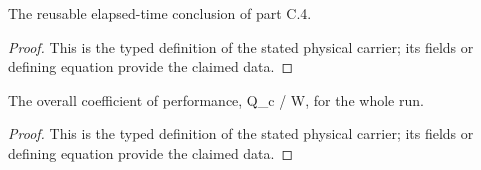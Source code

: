 \begin{definition}
  \label{def:physics:IPhO_2026_3_C_5:aux020}
  The reusable elapsed-time conclusion of part C.4.
\end{definition}
\begin{proof}
  This is the typed definition of the stated physical carrier; its fields or defining equation provide the claimed data.
\end{proof}

\begin{definition}
  \label{def:physics:IPhO_2026_3_C_5:aux021}
  The overall coefficient of performance, Q\_c / W, for the whole run.
\end{definition}
\begin{proof}
  This is the typed definition of the stated physical carrier; its fields or defining equation provide the claimed data.
\end{proof}
